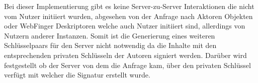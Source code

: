 Bei dieser Implementierung gibt es keine Server-zu-Server Interaktionen die nicht vom Nutzer initiiert wurden, abgesehen von der Anfrage nach Aktoren Objekten oder WebFinger Deskriptoren welche auch Nutzer initiiert sind, allerdings von Nutzern anderer Instanzen. Somit ist die Generierung eines weiteren Schlüsselpaars für den Server nicht notwendig da die Inhalte mit den entsprechenden privaten Schlüsseln der Autoren signiert werden. Darüber wird festgestellt ob der Server von dem die Anfrage kam, über den privaten Schlüssel verfügt mit welcher die Signatur erstellt wurde.